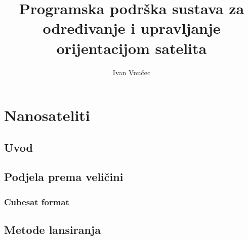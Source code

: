 \documentclass[times, utf8, diplomski, numeric]{templates/template}
\begin{document}

\title{Programska podrška sustava za određivanje i upravljanje orijentacijom satelita}


\author{Ivan Vnučec}

\maketitle

\izvornik


\tableofcontents

\nocite{*}
\chapter{Nanosateliti}{
    \section{Uvod}{
        \iffalse
        - sto su Nanosateliti
        - zasto postoje, 
            - za sto se koriste
            - tko ih koristi
        \fi
    }

    \section{Podjela prema veličini}{
        \subsection{Cubesat format}{
            \iffalse
            - sto je cubesat satelit
            - od cega se sastoji, 
                - gradja, 
                - nacin slaganja dodatnih modula
            - kojih sve verzije cubesat satelita postoje
            - zasto bas kocka
            - prednosti i mane cubesat satelita
            - navesti negdje brojke o udijelu cubesat sateltia u ostalim satelitima kroz godine
            - zasto je popularan cubesat format
            \fi
        }
    }

    \section{Metode lansiranja}{
        \iffalse
        - objasniti kako se sateliti lansiraju
            - objasni da oni nisu glavni payload
            - objasni kako su pakirani
            - objasni u koje orbite mogu ici
            - objasni tvrtke koje se bave lansiranjem
        - navedi koliko najcesce kosta lansiranje
        - navedi kako najlakse iznajmit lansiranje
        - rast lansiranja nanosateltia iz godine u godinu
            - pronaci negdje neke brojke o lansiranju cubesat satelita po godinama
        \fi
    }

}
\end{document}
